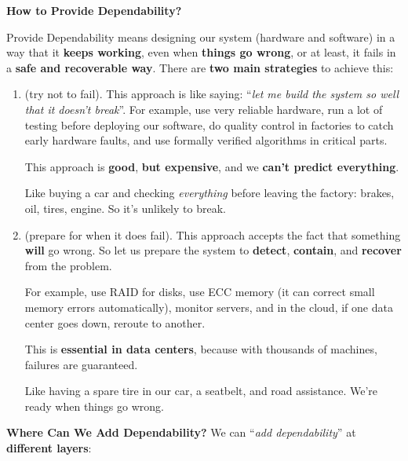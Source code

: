 \begin{flushleft}
    \textcolor{Green3}{ \textbf{How to Provide Dependability?}}
\end{flushleft}
Provide Dependability means designing our system (hardware and software) in a way that it \textbf{keeps working}, even when \textbf{things go wrong}, or at least, it fails in a \textbf{safe and recoverable way}. There are \textbf{two main strategies} to achieve this:
\begin{enumerate}
    \item {} (try not to fail). This approach is like saying: ``\emph{let me build the system so well that it doesn't break}''. For example, use very reliable hardware, run a lot of testing before deploying our software, do quality control in factories to catch early hardware faults, and use formally verified algorithms in critical parts.

    This approach is \textbf{good}, \textbf{but expensive}, and we \textbf{can't predict everything}.

    \begin{examplebox}
        Like buying a car and checking \emph{everything} before leaving the factory: brakes, oil, tires, engine. So it's unlikely to break.
    \end{examplebox}


    \item {} (prepare for when it does fail). This approach accepts the fact that something \textbf{will} go wrong. So let us prepare the system to \textbf{detect}, \textbf{contain}, and \textbf{recover} from the problem.

    For example, use RAID for disks, use ECC memory (it can correct small memory errors automatically), monitor servers, and in the cloud, if one data center goes down, reroute to another.

    This is \textbf{essential in data centers}, because with thousands of machines, failures are guaranteed.

    \begin{examplebox}
        Like having a spare tire in our car, a seatbelt, and road assistance. We're ready when things go wrong.
    \end{examplebox}
\end{enumerate}
\textcolor{Green3}{ \textbf{Where Can We Add Dependability?}} We can ``\emph{add dependability}'' at \textbf{different layers}:

